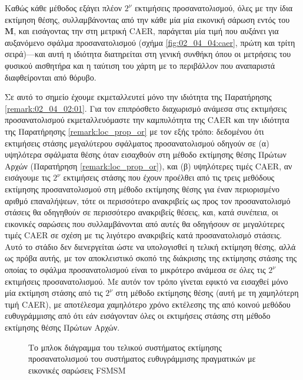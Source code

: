 Καθώς κάθε μέθοδος εξάγει πλέον $2^\nu$ εκτιμήσεις προσανατολισμού, όλες με την
ίδια εκτίμηση θέσης, συλλαμβάνοντας από την κάθε μία μία εικονική σάρωση εντός
του $\bm{M}$, και εισάγοντας την στη μετρική CAER, παράγεται μία τιμή που
αυξάνει για αυξανόμενο σφάλμα προσανατολισμού (σχήμα \ref{fig:02_04_04:caer},
πρώτη και τρίτη σειρά)---και αυτή η ιδιότητα διατηρείται στη γενική συνθήκη
όπου οι μετρήσεις του φυσικού αισθητήρα και η ταύτιση του χάρτη με το
περιβάλλον που αναπαριστά διαφθείρονται από θόρυβο.

Σε αυτό το σημείο έχουμε εκμεταλλευτεί μόνο την ιδιότητα της Παρατήρησης
\ref{remark:02_04_02:01}. Για τον επιπρόσθετο διαχωρισμό ανάμεσα στις
εκτιμήσεις προσανατολισμού εκμεταλλευόμαστε την καμπυλότητα της CAER και την
ιδιότητα της Παρατήρησης \ref{remark:loc_prop_or} με τον εξής τρόπο: δεδομένου
ότι εκτιμήσεις στάσης μεγαλύτερου σφάλματος  προσανατολισμού οδηγούν σε (α)
υψηλότερα σφάλματα θέσης όταν εισαχθούν στη μέθοδο εκτίμησης θέσης Πρώτων Αρχών
(Παρατήρηση \ref{remark:loc_prop_or}), και (β) υψηλότερες τιμές CAER, αν
εισάγουμε τις $2^\nu$ εκτιμήσεις στάσης που έχουν προέλθει από τις τρεις
μεθόδους εκτίμησης προσανατολισμού στη μέθοδο εκτίμησης θέσης για έναν
περιορισμένο αριθμό επαναλήψεων, τότε οι περισσότερο ανακριβείς ως προς τον
προσανατολισμό στάσεις θα οδηγηθούν σε περισσότερο ανακριβείς θέσεις, και, κατά
συνέπεια, οι εικονικές σαρώσεις που συλλαμβάνονται από αυτές θα οδηγήσουν σε
μεγαλύτερες τιμές CAER σε σχέση με τις λιγότερο ανακριβείς κατά προσανατολισμό
στάσεις. Αυτό το στάδιο δεν διενεργείται ώστε να υπολογισθεί η τελική εκτίμηση
θέσης, αλλά ως πρόβα αυτής, με τον αποκλειστικό σκοπό της διάκρισης της
εκτίμησης στάσης της οποίας το σφάλμα προσανατολισμού είναι το μικρότερο
ανάμεσα σε όλες τις $2^\nu$ εκτιμήσεις προσανατολισμού. Με αυτόν τον τρόπο
γίνεται εφικτό να εισαχθεί μόνο μία εκτίμηση στάσης από τις $2^\nu$ στη μέθοδο
εκτίμησης θέσης (αυτή με τη χαμηλότερη τιμή CAER), με αποτέλεσμα χαμηλότερο
χρόνο εκτέλεσης της από κοινού μεθόδου ευθυγράμμισης από ότι εάν εισάγονταν
όλες οι εκτιμήσεις στάσης στη μέθοδο εκτίμησης θέσης Πρώτων Αρχών.

\begin{figure}\centering
  
  \caption{\small Το μπλοκ διάγραμμα του τελικού συστήματος εκτίμησης
           προσανατολισμού του συστήματος ευθυγράμμισης πραγματικών με εικονικές
           σαρώσεις FSMSM}
  \label{fig:02_04_04:inner_rotation_system}
\end{figure}

